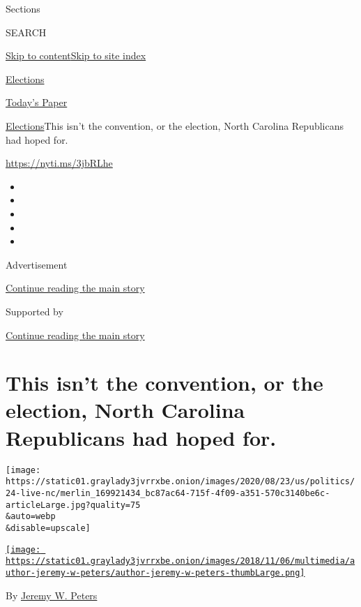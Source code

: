 Sections

SEARCH

\protect\hyperlink{site-content}{Skip to
content}\protect\hyperlink{site-index}{Skip to site index}

\href{https://www.nytimes3xbfgragh.onion/news-event/2020-election}{Elections}

\href{https://myaccount.nytimes3xbfgragh.onion/auth/login?response_type=cookie\&client_id=vi}{}

\href{https://www.nytimes3xbfgragh.onion/section/todayspaper}{Today's
Paper}

\href{/news-event/2020-election}{Elections}\textbar{}This isn't the
convention, or the election, North Carolina Republicans had hoped for.

\url{https://nyti.ms/3jbRLhe}

\begin{itemize}
\item
\item
\item
\item
\item
\end{itemize}

Advertisement

\protect\hyperlink{after-top}{Continue reading the main story}

Supported by

\protect\hyperlink{after-sponsor}{Continue reading the main story}

\hypertarget{this-isnt-the-convention-or-the-election-north-carolina-republicans-had-hoped-for}{%
\section{This isn't the convention, or the election, North Carolina
Republicans had hoped
for.}\label{this-isnt-the-convention-or-the-election-north-carolina-republicans-had-hoped-for}}

\texttt{[image: https://static01.graylady3jvrrxbe.onion/images/2020/08/23/us/politics/24-live-nc/merlin\_169921434\_bc87ac64-715f-4f09-a351-570c3140be6c-articleLarge.jpg?quality=75\\\&auto=webp\\\&disable=upscale]}

\href{https://www.nytimes3xbfgragh.onion/by/jeremy-w-peters}{\texttt{[image: https://static01.graylady3jvrrxbe.onion/images/2018/11/06/multimedia/author-jeremy-w-peters/author-jeremy-w-peters-thumbLarge.png]}}

By \href{https://www.nytimes3xbfgragh.onion/by/jeremy-w-peters}{Jeremy
W. Peters}

